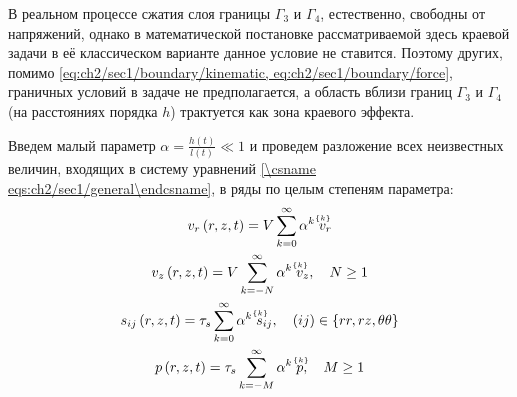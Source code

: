 В реальном процессе сжатия слоя границы $\Gamma_{3}$ и $\Gamma_{4}$, естественно, свободны от напряжений, однако в математической постановке рассматриваемой здесь краевой задачи в её классическом варианте данное условие не ставится. Поэтому других, помимо \cref{eq:ch2/sec1/boundary/kinematic, eq:ch2/sec1/boundary/force}, граничных условий в задаче не предполагается, а область вблизи границ $\Gamma_{3}$ и $\Gamma_{4}$(на расстояниях порядка $h$) трактуется как зона краевого эффекта.

Введем малый параметр $\alpha = \frac{h(t)}{l(t)} \ll 1$ и проведем разложение всех неизвестных величин, входящих в систему уравнений \cref{\csname eqs:ch2/sec1/general\endcsname}, в ряды по целым степеням параметра:
\begin{gather}
  \label{eqs:ch2/series/vr}
  v_{r}\left(r, z, t\right) = V \sum_{k=0}^{\infty}{\alpha^{k} \; \uindex{v}{k}_{r}}
  \\
  \label{eqs:ch2/series/vz}
  v_{z}\left(r, z, t\right) = V \sum_{k=-N}^{\infty}{\alpha^{k} \; \uindex{v}{k}_{z}}, \quad N \ge 1
  \\
  \label{eqs:ch2/series/sij}
  s_{ij}\left(r, z, t\right) = \tau_{s} \sum_{k=0}^{\infty}{\alpha^{k} \; \uindex{s}{k}_{ij}}, \quad (ij)\in\{rr, rz, \theta\theta\}
  \\
  \label{eqs:ch2/series/p}
  p\left(r, z, t \right) = \tau_{s} \sum_{k=-M}^{\infty}{\alpha^{k} \; \uindex{p}{k}}, \quad M \ge 1
\end{gather}

